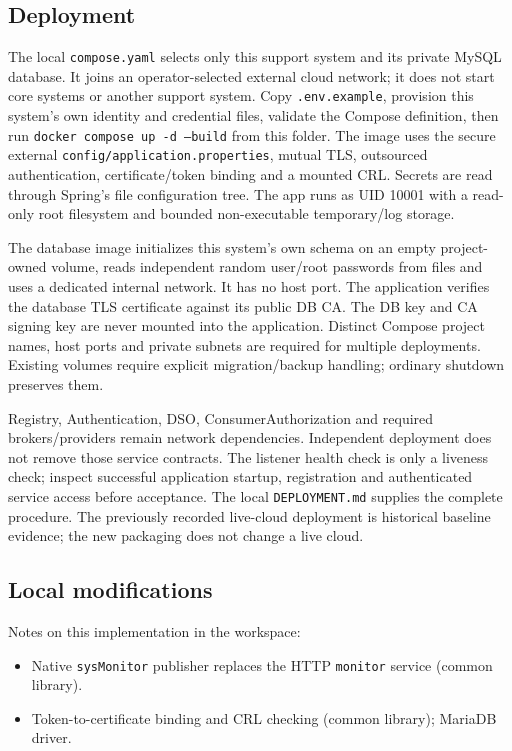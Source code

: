\documentclass[a4paper]{arrowhead}
\begin{document}
\subsection{Deployment}

The local \texttt{compose.yaml} selects only this support system and its private MySQL database. It joins an operator-selected external cloud network; it does not start core systems or another support system. Copy \texttt{.env.example}, provision this system's own identity and credential files, validate the Compose definition, then run \texttt{docker compose up -d --build} from this folder. The image uses the secure external \texttt{config/application.properties}, mutual TLS, outsourced authentication, certificate/token binding and a mounted CRL. Secrets are read through Spring's file configuration tree. The app runs as UID 10001 with a read-only root filesystem and bounded non-executable temporary/log storage.

The database image initializes this system's own schema on an empty project-owned volume, reads independent random user/root passwords from files and uses a dedicated internal network. It has no host port. The application verifies the database TLS certificate against its public DB CA. The DB key and CA signing key are never mounted into the application. Distinct Compose project names, host ports and private subnets are required for multiple deployments. Existing volumes require explicit migration/backup handling; ordinary shutdown preserves them.

Registry, Authentication, DSO, ConsumerAuthorization and required brokers/providers remain network dependencies. Independent deployment does not remove those service contracts. The listener health check is only a liveness check; inspect successful application startup, registration and authenticated service access before acceptance. The local \texttt{DEPLOYMENT.md} supplies the complete procedure. The previously recorded live-cloud deployment is historical baseline evidence; the new packaging does not change a live cloud.

\subsection{Local modifications}
\label{sec:local}

Notes on this implementation in the workspace:
\begin{itemize}
  \item Native \texttt{sysMonitor} publisher replaces the HTTP \texttt{monitor} service (common library).
  \item Token-to-certificate binding and CRL checking (common library); MariaDB driver.
\end{itemize}
\end{document}
